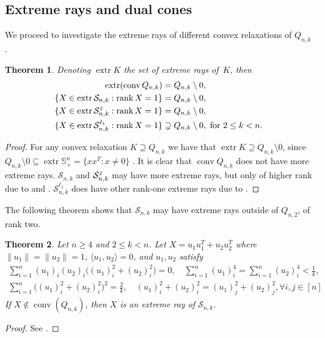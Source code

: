 \documentclass[11pt]{amsart}
\newcommand{\Szero}[2]{\ensuremath{\mathcal{S}_{#1,#2}}}
\newcommand{\Sone}[2]{\ensuremath{\mathcal{S}_{#1,#2}^{\ell_1}}}
\newcommand{\Sz}[2]{\ensuremath{\mathcal{S}_{#1,#2}^{\textit{\tiny{Z}}}}}
\theoremstyle{plain}
\newtheorem{thm}{Theorem}[section]
\theoremstyle{definition}
\theoremstyle{remark}
\renewcommand{\SS}{{\mathbb{S}}}
\DeclareMathOperator{\rank}{rank}
\DeclareMathOperator{\conv}{conv}
\DeclareMathOperator{\extr}{extr}
\begin{document}
	
	\subsection{Extreme rays and dual cones}
	We proceed to investigate the extreme rays of different convex relaxations of $Q_{n,k}$.
	
	\begin{thm}\label{thm:extreme_ray_of_Q}
		Denoting $\extr K$ the set of extreme rays of~$K$, then
		\begin{align*}
			\extr(\conv Q_{n,k})
			&= Q_{n,k} \setminus 0,\\
			\{X \in \extr \Szero{n}{k} : \rank X = 1\}
			&= Q_{n,k} \setminus 0,\\
			\{X \in \extr \Sz{n}{k} : \rank X = 1\}
			&= Q_{n,k} \setminus 0,\\
			\{X \in \extr \Sone{n}{k} : \rank X = 1\}
			&\supsetneq Q_{n,k} \setminus 0, \text{ for } 2 \leq k < n.
		\end{align*}
	\end{thm}
	\begin{proof}
		For any convex relaxation $K \supseteq Q_{n,k}$ we have that
		$\extr K \supseteq Q_{n,k} \setminus 0$,
		since $Q_{n,k}\setminus 0 \subseteq \extr \SS^n_+ = \{ x x^T : x \neq 0 \}$ .
		It is clear that $\conv Q_{n,k}$ does not have more extreme rays.
		$\Szero{n}{k}$ and $\Sz{n}{k}$ may have more extreme rays,
		but only of higher rank due to  and .
		$\Sone{n}{k}$ does have other rank-one extreme rays due to .
	\end{proof}
	
	The following theorem shows that \Szero{n}{k} may have extreme rays outside of \(Q_{n,2}\), of rank two. 
	
	\begin{thm}\label{thm:extreme_ray_special}
		Let \(n\geq4\) and \(2\leq k< n\).
		Let \(X = u_1u_1^T + u_2u_2^T\) where \(\|u_1\|=\|u_2\|=1\), \(\langle u_1,u_2\rangle=0\), and \(u_1,u_2\) satisfy
		\begin{equation}\label{eq:extreme_ray_special}
            \begin{gathered}
				\sum_{i=1}^n(u_1)_i(u_2)_i\big((u_1)^2_i+(u_2)^2_i\big) = 0,\quad
				\sum_{i=1}^n(u_1)_i^4 = \sum_{i=1}^n(u_2)_i^4 < \frac{1}{k},\quad \\
				\sum_{i=1}^n\big((u_1)_i^2 + (u_2)_i^2\big)^2 = \frac{2}{k},\quad (u_1)_i^2 + (u_2)_i^2 = (u_1)_j^2 + (u_2)_j^2,\forall i,j\in [n]
            \end{gathered}
		\end{equation}
		If \(X\notin \conv(Q_{n,k})\), then \(X\) is an extreme ray of \Szero{n}{k}.
	\end{thm}
    \begin{proof}
        See .
    \end{proof}
	
\end{document}
